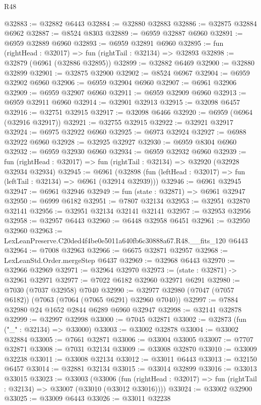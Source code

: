 \begin{lexlean}{R48}
\begin{coremodule}
@32883 := @32882 @6443
@32884 := @32880 @32883
@32886 := @32875 @32884 @6962
@32887 := @8524 @8303
@32889 := @6959 @32887 @6960
@32891 := @6959 @32889 @6960
@32893 := @6959 @32891 @6960
@32895 := fun (rightHead : @32017) => fun (rightTail : @32134) => @32893
@32898 := @32879 (@6961 (@32886 @32895))
@32899 := @32882 @6469
@32900 := @32880 @32899
@32901 := @32875 @32900
@32902 := @8524 @6967
@32904 := @6959 @32902 @6960
@32906 := @6959 @32904 @6960
@32907 := @6961 @32906
@32909 := @6959 @32907 @6960
@32911 := @6959 @32909 @6960
@32913 := @6959 @32911 @6960
@32914 := @32901 @32913
@32915 := @32098 @6457
@32916 := @32751 @32915
@32917 := @32098 @6466
@32920 := @6959 (@6964 (@32916 @32917))
@32921 := @32755 @32915
@32922 := @32921 @32917
@32924 := @6975 @32922 @6960
@32925 := @6973 @32924
@32927 := @6988 @32922 @6960
@32928 := @32925 @32927
@32930 := @6959 @8304 @6960
@32932 := @6959 @32930 @6960
@32934 := @6959 @32932 @6960
@32939 := fun (rightHead : @32017) => fun (rightTail : @32134) => @32920 (@32928 @32934 @32934)
@32945 := @6961
    (@32898 (fun (leftHead : @32017) => fun (leftTail : @32134) => @6961 (@32914 @32939)))
@32946 := @6961 @32945
@32947 := @6961 @32946
@32949 := fun (state : @32871) => @6961 @32947
@32950 := @6999 @6182
@32951 := @7807 @32134
@32953 := @32951 @32870 @32141
@32956 := @32951 @32134 @32141 @32141
@32957 := @32953 @32956
@32958 := @32957 @6443
@32960 := @6448 @32958 @6451
@32961 := @32950 @32960
@32963 := LexLeanPreserve.C20ded4f4be0e5011a640fb6c30888a67.R48.__fits_120 @6443
@32964 := @7008 @32963
@32966 := @6675 @32871 @32957
@32968 := LexLeanStd.Order.mergeStep @6437
@32969 := @32968 @6443
@32970 := @32966 @32969
@32971 := @32964 @32970
@32973 := (state : @32871) -> @32961 @32971
@32977 := @7022 @6182 @32960 @32971 @6291
@32980 := @7030 (@7037 @32958) @7040
@32990 := @32977 @32980 (@7047 (@7057 @6182)) (@7063 (@7064 (@7065 @6291) @32960 @7040))
@32997 := @7884 @32980 @24 @1652 @2844 @6289 @6960 @32947
@32998 := @32141 @32878
@32999 := @32997 @32998
@33000 := @7045 @32871
@33002 := @32873 (fun ("_" : @32134) => @33000)
@33003 := @33002 @32878
@33004 := @33002 @32884
@33005 := @7661 @32871
@33006 := @33004 @33005
@33007 := @7707 @32871
@33008 := @7031 @32134
@33009 := @33008 @32870
@33010 := @33009 @32238
@33011 := @33008 @32134
@33012 := @33011 @6443
@33013 := @32150 @6457
@33014 := @32881 @32134
@33015 := @33014 @32899
@33016 := @33013 @33015
@33023 := @33003
    (@33006
      (fun (rightHead : @32017) => fun (rightTail : @32134) => @33007 (@33010 (@33012 @33016))))
@33024 := @33002 @32900
@33025 := @33009 @6443
@33026 := @33011 @32238

\end{coremodule}
\end{lexlean}
